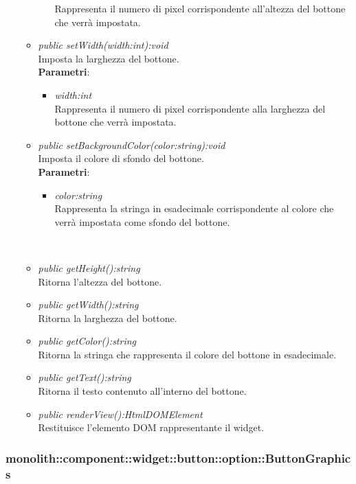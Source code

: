 \begin{itemize}
\begin{itemize}
\begin{itemize}
		Rappresenta il numero di pixel corrispondente all'altezza del bottone che verrà impostata.
		\end{itemize}
	\item \textit{public setWidth(width:int):void}\\
	Imposta la larghezza del bottone.
		\\ \textbf{Parametri}: \begin{itemize}
		\item \textit{width:int}\\
		Rappresenta il numero di pixel corrispondente alla larghezza del bottone che verrà impostata.
		\end{itemize}
	\item \textit{public setBackgroundColor(color:string):void}\\
	Imposta il colore di sfondo del bottone.
		\\ \textbf{Parametri}: \begin{itemize}
		\item \textit{color:string}\\
		Rappresenta la stringa in esadecimale corrispondente al colore che verrà impostata come sfondo del bottone.
		\end{itemize}\\
	\item \textit{public getHeight():string}\\
	Ritorna l'altezza del bottone.
	\item \textit{public getWidth():string}\\
	Ritorna la larghezza del bottone.
	\item \textit{public getColor():string}\\
	Ritorna la stringa che rappresenta il colore del bottone in esadecimale.
	\item \textit{public getText():string}\\
	Ritorna il testo contenuto all'interno del bottone.
	\item \textit{public renderView():HtmlDOMElement}\\
	Restituisce l'elemento DOM rappresentante il widget.
	\end{itemize}
\end{itemize}

\subsubsection{monolith::component::widget::button::option::ButtonGraphics}

